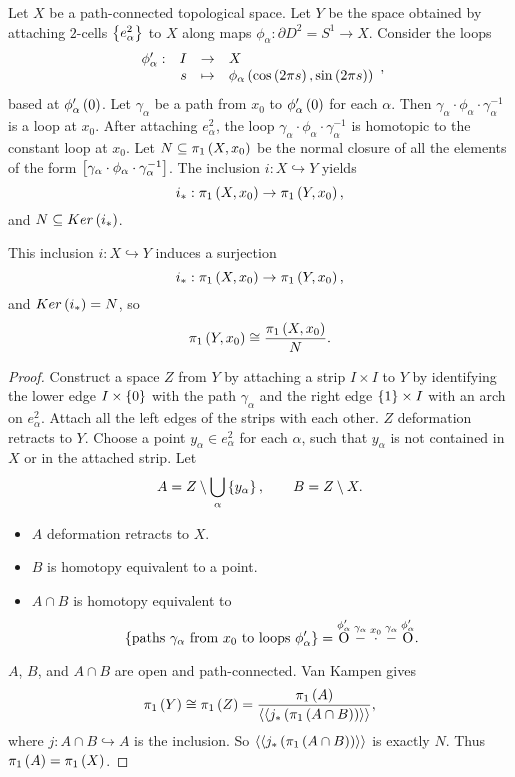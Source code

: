 Let $ X $ be a path-connected topological space. Let $ Y $ be the space obtained by attaching $ 2 $-cells $ \cb{e_\alpha^2} $ to $ X $ along maps $ \phi_\alpha : \partial D^2 = S^1 \to X $. Consider the loops
$$ \function[\phi_\alpha']{I}{X}{s}{\phi_\alpha\rb{\cos\rb{2\pi s}, \sin\rb{2\pi s}}}, $$
based at $ \phi_\alpha'\rb{0} $. Let $ \gamma_\alpha $ be a path from $ x_0 $ to $ \phi_\alpha'\rb{0} $ for each $ \alpha $. Then $ \gamma_\alpha \cdot \phi_\alpha \cdot \gamma_\alpha^{-1} $ is a loop at $ x_0 $. After attaching $ e_\alpha^2 $, the loop $ \gamma_\alpha \cdot \phi_\alpha \cdot \gamma_\alpha^{-1} $ is homotopic to the constant loop at $ x_0 $. Let $ N \subseteq \pi_1\rb{X, x_0} $ be the normal closure of all the elements of the form $ \sb{\gamma_\alpha \cdot \phi_\alpha \cdot \gamma_\alpha^{-1}} $. The inclusion $ i : X \hookrightarrow Y $ yields
$$ i_* : \pi_1\rb{X, x_0} \to \pi_1\rb{Y, x_0}, $$
and $ N \subseteq Ker\rb{i_*} $.

\begin{proposition}
\label{prop:1.26}
This inclusion $ i : X \hookrightarrow Y $ induces a surjection
$$ i_* : \pi_1\rb{X, x_0} \to \pi_1\rb{Y, x_0}, $$
and $ Ker\rb{i_*} = N $, so
$$ \pi_1\rb{Y, x_0} \cong \dfrac{\pi_1\rb{X, x_0}}{N}. $$
\end{proposition}

\begin{proof}
Construct a space $ Z $ from $ Y $ by attaching a strip $ I \times I $ to $ Y $ by identifying the lower edge $ I \times \cb{0} $ with the path $ \gamma_\alpha $ and the right edge $ \cb{1} \times I $ with an arch on $ e_\alpha^2 $. Attach all the left edges of the strips with each other. $ Z $ deformation retracts to $ Y $. Choose a point $ y_\alpha \in e_\alpha^2 $ for each $ \alpha $, such that $ y_\alpha $ is not contained in $ X $ or in the attached strip. Let
$$ A = Z \setminus \bigcup_\alpha \cb{y_\alpha}, \qquad B = Z \setminus X. $$
\begin{itemize}
\item $ A $ deformation retracts to $ X $.
\item $ B $ is homotopy equivalent to a point.
\item $ A \cap B $ is homotopy equivalent to
$$ \cb{\text{paths} \ \gamma_\alpha \ \text{from} \ x_0 \ \text{to loops} \ \phi_\alpha'} = \overset{\phi_\alpha'}{\text{O}}\overset{\gamma_\alpha}{-}\overset{x_0}{\cdot}\overset{\gamma_\alpha}{-}\overset{\phi_\alpha'}{\text{O}}. $$
\end{itemize}
$ A $, $ B $, and $ A \cap B $ are open and path-connected. Van Kampen gives
$$ \pi_1\rb{Y} \cong \pi_1\rb{Z} = \dfrac{\pi_1\rb{A}}{\ab{\ab{j_*\rb{\pi_1\rb{A \cap B}}}}}, $$
where $ j : A \cap B \hookrightarrow A $ is the inclusion. So $ \ab{\ab{j_*\rb{\pi_1\rb{A \cap B}}}} $ is exactly $ N $. Thus $ \pi_1\rb{A} = \pi_1\rb{X} $.
\end{proof}

